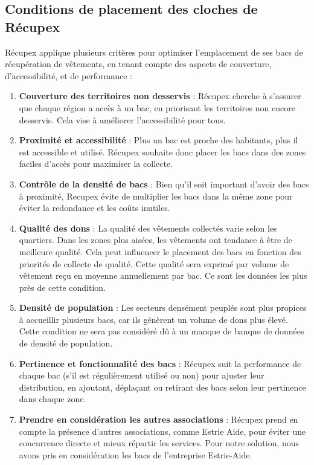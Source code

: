 \documentclass[11pt]{article}
\begin{document}
\subsection{Conditions de placement des cloches de Récupex}
Récupex applique plusieurs critères pour optimiser l’emplacement de ses bacs de récupération de vêtements, en tenant compte des aspects de couverture, d'accessibilité, et de performance :

\begin{enumerate}
    \item \textbf{Couverture des territoires non desservis} : Récupex cherche à s’assurer que chaque région a accès à un bac, en priorisant les territoires non encore desservis. Cela vise à améliorer l’accessibilité pour tous.

    \item \textbf{Proximité et accessibilité} : Plus un bac est proche des habitants, plus il est accessible et utilisé. Récupex souhaite donc placer les bacs dans des zones faciles d’accès pour maximiser la collecte.

    \item \textbf{Contrôle de la densité de bacs} : Bien qu’il soit important d’avoir des bacs à proximité, Recupex évite de multiplier les bacs dans la même zone pour éviter la redondance et les coûts inutiles.

    \item\textbf{Qualité des dons} : La qualité des vêtements collectés varie selon les quartiers. Dans les zones plus aisées, les vêtements ont tendance à être de meilleure qualité. Cela peut influencer le placement des bacs en fonction des priorités de collecte de qualité. Cette qualité sera exprimé par volume de vêtement reçu en moyenne annuellement par bac. Ce sont les données les plus près de cette condition.

    \item\textbf{Densité de population} : Les secteurs densément peuplés sont plus propices à accueillir plusieurs bacs, car ils génèrent un volume de dons plus élevé. Cette condition ne sera pas considéré dû à un manque de banque de données de densité de population.

    \item\textbf{Pertinence et fonctionnalité des bacs} : Récupex suit la performance de chaque bac (s’il est régulièrement utilisé ou non) pour ajuster leur distribution, en ajoutant, déplaçant ou retirant des bacs selon leur pertinence dans chaque zone.

    \item\textbf{Prendre en considération les autres associations} : Récupex prend en compte la présence d’autres associations, comme Estrie Aide, pour éviter une concurrence directe et mieux répartir les services. Pour notre solution, nous avons pris en considération les bacs de l'entreprise Estrie-Aide.


\end{enumerate}
\end{document}
